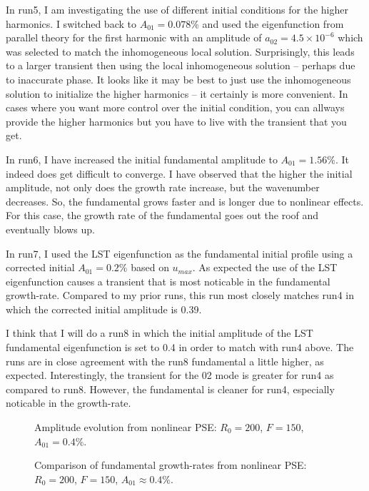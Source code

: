 \documentclass[12pt]{article}
\begin{document}
In run5, I am investigating the use of different initial conditions for the
higher harmonics.  I switched back to $A_{01} = 0.078\%$ and used the
eigenfunction from parallel theory for the first harmonic with an amplitude of
$a_{02} = 4.5\times10^{-6}$ which was selected to match the inhomogeneous
local solution.  Surprisingly, this leads to a larger transient then using the
local inhomogeneous solution -- perhaps due to inaccurate phase.  It looks
like it may be best to just use the inhomogeneous solution to initialize the
higher harmonics -- it certainly is more convenient.  In cases where you want
more control over the initial condition, you can allways provide the higher
harmonics but you have to live with the transient that you get.

In run6, I have increased the initial fundamental amplitude to $A_{01} =
1.56\%$.  It indeed does get difficult to converge.  I have observed that the
higher the initial amplitude, not only does the growth rate increase, but the
wavenumber decreases.  So, the fundamental grows faster and is longer due to
nonlinear effects.  For this case, the growth rate of the fundamental goes out
the roof and eventually blows up.

In run7, I used the LST eigenfunction as the fundamental initial profile using
a corrected initial $A_{01}=0.2\%$ based on $u_{max}$.  As expected the use of
the LST eigenfunction causes a transient that is most noticable in the
fundamental growth-rate.  Compared to my prior runs, this run most closely
matches run4 in which the corrected initial amplitude is 0.39.

I think that I will do a run8 in which the initial amplitude of the LST
fundamental eigenfunction is set to 0.4 in order to match with run4 above.
The runs are in close agreement with the run8 fundamental a little higher, as
expected.  Interestingly, the transient for the 02 mode is greater for run4 as
compared to run8.  However, the fundamental is cleaner for run4, especially
noticable in the growth-rate.

\begin{figure}
\centering \epsfxsize=4.5in 
\caption {Amplitude evolution from nonlinear PSE: $R_0=200$, $F=150$,
$A_{01}=0.4\%$. \label{f:amp.r8}}
\end{figure}

\begin{figure}
\centering \epsfxsize=4.5in 
\caption {Comparison of fundamental growth-rates from nonlinear PSE:
$R_0=200$, $F=150$, $A_{01} \approx 0.4\%$. \label{f:gr.r48}}
\end{figure}
\end{document}

